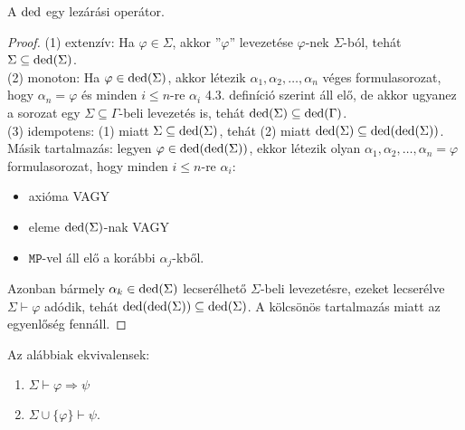 \begin{lem} A $\mathop{\mathrm{ded}}$ egy lezárási operátor.
\end{lem}
\begin{proof}
(1) extenzív: Ha $\varphi \in \Sigma$, akkor ''$\varphi$'' levezetése $\varphi$-nek $\Sigma$-ból, tehát $\Sigma \subseteq \mathop{\mathrm{ded}}(\Sigma)$. \\
\indent (2) monoton: Ha $\varphi \in \mathop{\mathrm{ded}}(\Sigma)$, akkor létezik $\alpha_1, \alpha_2, \ldots, \alpha_n$ véges formulasorozat, hogy $\alpha_n=\varphi$ és minden $i \leqslant n$-re $\alpha_i$ 4.3. definíció szerint áll elő, de akkor ugyanez a sorozat egy $\Sigma \subseteq \Gamma$-beli levezetés is, tehát $\mathop{\mathrm{ded}}(\Sigma) \subseteq \mathop{\mathrm{ded}}(\Gamma)$. \\
\indent (3) idempotens: (1) miatt $\Sigma \subseteq \mathop{\mathrm{ded}}(\Sigma)$, tehát (2) miatt $\mathop{\mathrm{ded}}(\Sigma) \subseteq \mathop{\mathrm{ded}}(\mathop{\mathrm{ded}}(\Sigma))$. Másik tartalmazás: legyen $\varphi \in \mathop{\mathrm{ded}}(\mathop{\mathrm{ded}}(\Sigma))$, ekkor létezik olyan $\alpha_1, \alpha_2, \ldots, \alpha_n = \varphi$ formulasorozat, hogy minden $i \leqslant n$-re $\alpha_i$:
\begin{itemize}
\item axióma VAGY
\item eleme $\mathop{\mathrm{ded}}(\Sigma)$-nak VAGY
\item $\texttt{MP}$-vel áll elő a korábbi $\alpha_j$-kből.
\end{itemize} Azonban bármely $\alpha_k \in \mathop{\mathrm{ded}}(\Sigma)$ lecserélhető $\Sigma$-beli levezetésre, ezeket lecserélve $\Sigma \vdash \varphi$ adódik, tehát $\mathop{\mathrm{ded}}(\mathop{\mathrm{ded}}(\Sigma)) \subseteq \mathop{\mathrm{ded}}(\Sigma)$. A kölcsönös tartalmazás miatt az egyenlőség fennáll.
\end{proof}
\begin{theo} Az alábbiak ekvivalensek:
\begin{enumerate}
\item $\Sigma \vdash \varphi \Rightarrow \psi$
\item $\Sigma \cup \lbrace \varphi \rbrace \vdash \psi.$
\end{enumerate}
\end{theo}

